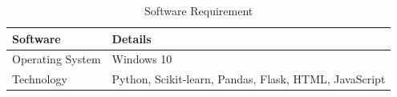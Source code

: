 \begin{table}[H]
  \centering
  \caption{Software Requirement} \label{tab:software_requirement}
  \begin{tabular}{|L{10em}|L{25em}|}
    \hline
    \textbf{Software} & \textbf{Details}
    \rule[-3ex]{0pt}{6ex}                                                     \\\hline
    Operating System  & Windows 10
    \rule[-2ex]{0pt}{4ex}                                                     \\\hline
    Technology        & Python, Scikit-learn, Pandas, Flask, HTML, JavaScript
    \rule[-2ex]{0pt}{4ex}                                                     \\\hline
  \end{tabular}
\end{table}